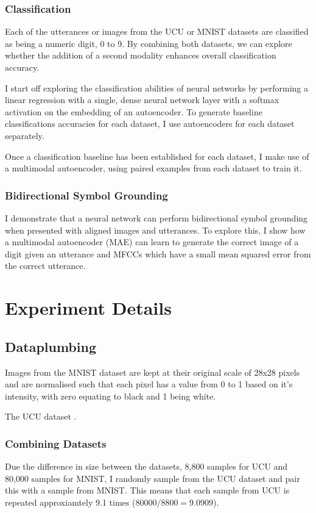\subsubsection{Classification}
Each of the utterances or images from the UCU or MNIST datasets are classified as being a numeric digit, 0 to 9. By combining both datasets, we can explore whether the addition of a second modality enhances overall classification accuracy.

I start off exploring the classification abilities of neural networks by performing a linear regression with a single, dense neural network layer with a softmax activation on the embedding of an autoencoder. To generate baseline classifications accuracies for each dataset, I use autoencoders for each dataset separately.

Once a classification baseline has been established for each dataset, I make use of a multimodal autoencoder, using paired examples from each dataset to train it.

\subsubsection{Bidirectional Symbol Grounding}

I demonstrate that a neural network can perform bidirectional symbol grounding \cite{barsalou2008grounded} when presented with aligned images and utterances. To explore this, I show how a multimodal autoencoder (MAE) can learn to generate the correct image of a digit given an utterance and MFCCs which have a small mean squared error from the correct utterance.


\section{Experiment Details}
\subsection{Dataplumbing}
Images from the MNIST dataset are kept at their original scale of 28x28 pixels and are normalised such that each pixel has a value from 0 to 1 based on it's intensity, with zero equating to black and 1 being white.

The UCU dataset .

\subsubsection{Combining Datasets}
Due the difference in size between the datasets, 8,800 samples for UCU and 80,000 samples for MNIST, I randomly sample from the UCU dataset and pair this with a sample from MNIST. This means that each sample from UCU is repeated approxiamtely 9.1 times ($80000/8800=9.0909$).

